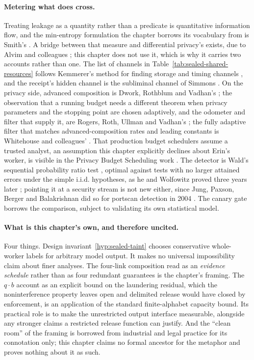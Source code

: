 \documentclass[11pt,a4paper]{article}
\theoremstyle{definition}
\begin{document}
\paragraph{Metering what does cross.}
Treating leakage as a quantity rather than a predicate is quantitative
information flow, and the min-entropy formulation the chapter borrows its
vocabulary from is Smith's . A bridge between that measure
and differential privacy's exists, due to Alvim and colleagues
; this chapter does not use it, which is why it carries two
accounts rather than one. The list of channels in
Table~\ref{tab:sealed-shared-resources} follows Kemmerer's method for
finding storage and timing channels , and the receipt's
hidden channel is the subliminal channel of Simmons . On the privacy side, advanced composition is
Dwork, Rothblum and Vadhan's ; the observation that a running
budget needs a different theorem when privacy parameters and the stopping point
are chosen adaptively, and the odometer and filter that supply it, are Rogers,
Roth, Ullman and Vadhan's ; the fully adaptive filter that
matches advanced-composition rates and leading constants is Whitehouse and colleagues'
. That production budget schedulers assume a trusted analyst,
an assumption this chapter explicitly declines about Erin's worker, is visible
in the Privacy Budget Scheduling work . The detector is Wald's
sequential probability ratio test , optimal against tests with
no larger attained errors under the simple i.i.d. hypotheses, as he and
Wolfowitz proved three years later ; pointing it at a
security stream is not new either, since Jung, Paxson, Berger and Balakrishnan
did so for portscan detection in 2004 . The canary gate borrows
the comparison, subject to validating its own statistical model.

\paragraph{What is this chapter's own, and therefore uncited.}
Four things. Design invariant~\ref{hyp:sealed-taint} chooses conservative whole-worker
labels for arbitrary model output. It makes no universal impossibility claim
about finer analyses. The four-link composition read as an \emph{evidence schedule} rather than
as four redundant guarantees is the chapter's framing. The $q\cdot b$ account
as an explicit bound on the laundering residual, which the noninterference
property leaves open and delimited release would have closed by enforcement,
is an application of the standard finite-alphabet capacity bound. Its practical
role is to make the unrestricted output interface measurable, alongside any
stronger claims a restricted release function can justify. And the ``clean room'' of the
framing is borrowed from industrial and legal practice for its connotation
only; this chapter claims no formal ancestor for the metaphor and proves
nothing about it as such.
\end{document}
